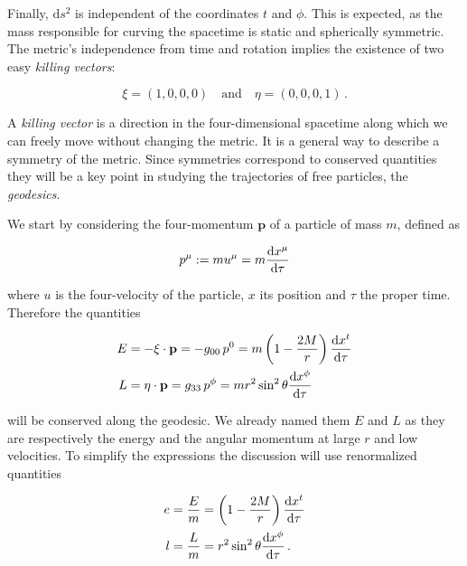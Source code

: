 Finally, $\mathrm{d}s^2$ is independent of the coordinates $t$ and $\phi$.
This is expected, as the mass responsible for curving the spacetime is static
and spherically symmetric.
The metric’s independence from time and rotation implies the existence of two
easy \textit{killing vectors}:

\begin{equation}
    \xi = (1, 0, 0, 0) \quad \text{and} \quad \eta = (0, 0, 0, 1) \, .
    \label{cap1:eq:xi_eta}
\end{equation}

A \textit{killing vector} is a direction in the four-dimensional spacetime
along which we can freely move without changing the metric.
It is a general way to describe a symmetry of the metric.
Since symmetries correspond to conserved quantities they will be a key point in
studying the trajectories of free particles, the \textit{geodesics}.

We start by considering the four-momentum $\mathbf{p}$ of a particle of mass
$m$, defined as

\begin{equation}
    p^\mu := m u^\mu = m \dv{x^\mu}{\tau}
\end{equation}

where $u$ is the four-velocity of the particle, $x$ its position and $\tau$ the
proper time.
Therefore the quantities

\begin{align*}
    E &= - \mathbf{\xi \cdot p} =
    - g_{00} \, p^0 = m \left( 1 - \frac{2M}{r} \right) \dv{x^t}{\tau} \\
    L &= \mathbf{\eta \cdot p} =
    g_{33} \, p^\phi = m r^2 \sin^2 \theta \dv{x^\phi}{\tau}
\end{align*}

will be conserved along the geodesic.
We already named them $E$ and $L$ as they are respectively the energy and the
angular momentum at large $r$ and low velocities.
To simplify the expressions the discussion will use renormalized quantities

\begin{subequations}
    \begin{align}
        e &= \frac{E}{m} = \left( 1 - \frac{2M}{r} \right) \dv{x^t}{\tau}
        \label{cap1:eq:conserved_e} \\
        l &= \frac{L}{m} = r^2 \sin^2 \theta \dv{x^\phi}{\tau} \, .
        \label{cap1:eq:conserved_l}
    \end{align}
\end{subequations}

